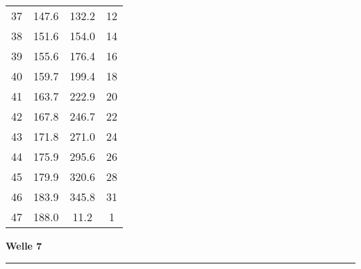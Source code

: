 \documentclass[10pt, a4paper]{article}
\begin{document}
\begin{center}
\begin{tabular}{c|c|c|c}
		37 & 147.6 & 132.2 & 12 \\
		38 & 151.6 & 154.0 & 14 \\
		39 & 155.6 & 176.4 & 16 \\
		40 & 159.7 & 199.4 & 18 \\
		41 & 163.7 & 222.9 & 20 \\
		42 & 167.8 & 246.7 & 22 \\
		43 & 171.8 & 271.0 & 24 \\
		44 & 175.9 & 295.6 & 26 \\
		45 & 179.9 & 320.6 & 28 \\
		46 & 183.9 & 345.8 & 31 \\
		47 & 188.0 & 11.2 & 1 \\
	\end{tabular}
\end{center}
\newpage
\centerline{{\bf Welle 7} }
\rule{1.0\textwidth}{0.5mm}
\end{document}
